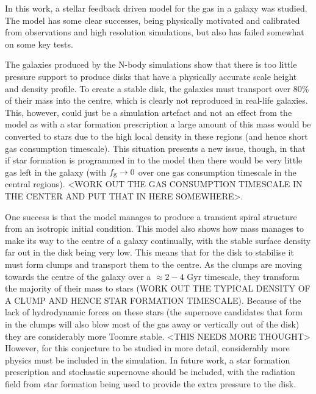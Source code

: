 In this work, a stellar feedback driven model for the gas in a galaxy was studied.
The model has some clear successes, being physically motivated and calibrated from observations and high resolution simulations, but also has failed somewhat on some key tests.

The galaxies produced by the N-body simulations show that there is too little pressure support to produce disks that have a physically accurate scale height and density profile.
To create a stable disk, the galaxies must transport over 80\% of their mass into the centre, which is clearly not reproduced in real-life galaxies.
This, however, could just be a simulation artefact and not an effect from the model as with a star formation prescription a large amount of this mass would be converted to stars due to the high local density in these regions (and hence short gas consumption timescale).
This situation presents a new issue, though, in that if star formation is programmed in to the model then there would be very little gas left in the galaxy (with $f_\mathrm{g} \rightarrow 0$ over one gas consumption timescale in the central regions). <WORK OUT THE GAS CONSUMPTION TIMESCALE IN THE CENTER AND PUT THAT IN HERE SOMEWHERE>.

One success is that the model manages to produce a transient spiral structure from an isotropic initial condition.
This model also shows how mass manages to make its way to the centre of a galaxy continually, with the stable surface density far out in the disk being very low.
This means that for the disk to stabilise it must form clumps and transport them to the centre.
As the clumps are moving towards the centre of the galaxy over a $\approx 2-4$ Gyr timescale, they transform the majority of their mass to stars (WORK OUT THE TYPICAL DENSITY OF A CLUMP AND HENCE STAR FORMATION TIMESCALE).
Because of the lack of hydrodynamic forces on these stars (the supernove candidates that form in the clumps will also blow most of the gas away or vertically out of the disk) they are considerably more Toomre stable. <THIS NEEDS MORE THOUGHT>
However, for this conjecture to be studied in more detail, considerably more physics must be included in the simulation.
In future work, a star formation prescription and stochastic supernovae should be included, with the radiation field from star formation being used to provide the extra pressure to the disk.

